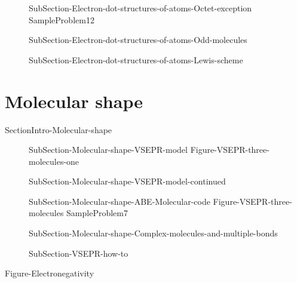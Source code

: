 \documentclass[main.tex]{subfiles}
\begin{document}
\begin{description}
\item[] {SubSection-Electron-dot-structures-of-atoms-Octet-exception}
{SampleProblem12}
\item[] {SubSection-Electron-dot-structures-of-atoms-Odd-molecules}
\newpage\vspace{2cm}\hspace{-4cm}{Table-Molecular-geometries}
\newpage
\item[]{SubSection-Electron-dot-structures-of-atoms-Lewis-scheme}  
\end{description}
 

\section{Molecular shape}{SectionIntro-Molecular-shape}
\sloppy\begin{description}
\item[] {SubSection-Molecular-shape-VSEPR-model}
{Figure-VSEPR-three-molecules-one}
\item[] {SubSection-Molecular-shape-VSEPR-model-continued}
\item[] {SubSection-Molecular-shape-ABE-Molecular-code}
{Figure-VSEPR-three-molecules}
{SampleProblem7}
\item[] {SubSection-Molecular-shape-Complex-molecules-and-multiple-bonds}
\item[]{SubSection-VSEPR-how-to}  
\end{description}

{Figure-Electronegativity}	
\end{document}
